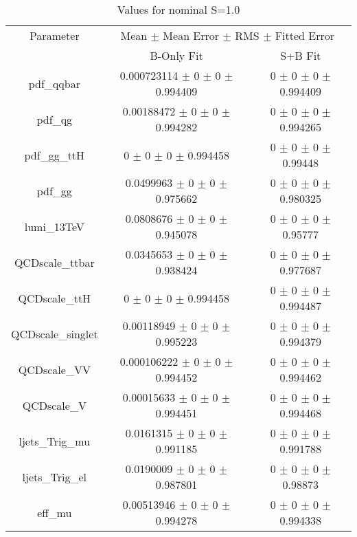 \begin{table}
\centering
\caption{Values for nominal S=1.0}
\begin{tabular}{ccc}
\toprule
Parameter 	& \multicolumn{2}{c}{Mean $\pm$ Mean Error $\pm$ RMS $\pm$ Fitted Error}\\
 	& B-Only Fit & S+B Fit\\
\midrule
pdf\_qqbar 	& \num{0.000723114} $\pm$ \num{0} $\pm$ \num{0} $\pm$ \num{0.994409} 	& \num{0} $\pm$ \num{0} $\pm$ \num{0} $\pm$ \num{0.994409}\\
pdf\_qg 	& \num{0.00188472} $\pm$ \num{0} $\pm$ \num{0} $\pm$ \num{0.994282} 	& \num{0} $\pm$ \num{0} $\pm$ \num{0} $\pm$ \num{0.994265}\\
pdf\_gg\_ttH 	& \num{0} $\pm$ \num{0} $\pm$ \num{0} $\pm$ \num{0.994458} 	& \num{0} $\pm$ \num{0} $\pm$ \num{0} $\pm$ \num{0.99448}\\
pdf\_gg 	& \num{0.0499963} $\pm$ \num{0} $\pm$ \num{0} $\pm$ \num{0.975662} 	& \num{0} $\pm$ \num{0} $\pm$ \num{0} $\pm$ \num{0.980325}\\
lumi\_13TeV 	& \num{0.0808676} $\pm$ \num{0} $\pm$ \num{0} $\pm$ \num{0.945078} 	& \num{0} $\pm$ \num{0} $\pm$ \num{0} $\pm$ \num{0.95777}\\
QCDscale\_ttbar 	& \num{0.0345653} $\pm$ \num{0} $\pm$ \num{0} $\pm$ \num{0.938424} 	& \num{0} $\pm$ \num{0} $\pm$ \num{0} $\pm$ \num{0.977687}\\
QCDscale\_ttH 	& \num{0} $\pm$ \num{0} $\pm$ \num{0} $\pm$ \num{0.994458} 	& \num{0} $\pm$ \num{0} $\pm$ \num{0} $\pm$ \num{0.994487}\\
QCDscale\_singlet 	& \num{0.00118949} $\pm$ \num{0} $\pm$ \num{0} $\pm$ \num{0.995223} 	& \num{0} $\pm$ \num{0} $\pm$ \num{0} $\pm$ \num{0.994379}\\
QCDscale\_VV 	& \num{0.000106222} $\pm$ \num{0} $\pm$ \num{0} $\pm$ \num{0.994452} 	& \num{0} $\pm$ \num{0} $\pm$ \num{0} $\pm$ \num{0.994462}\\
QCDscale\_V 	& \num{0.00015633} $\pm$ \num{0} $\pm$ \num{0} $\pm$ \num{0.994451} 	& \num{0} $\pm$ \num{0} $\pm$ \num{0} $\pm$ \num{0.994468}\\
ljets\_Trig\_mu 	& \num{0.0161315} $\pm$ \num{0} $\pm$ \num{0} $\pm$ \num{0.991185} 	& \num{0} $\pm$ \num{0} $\pm$ \num{0} $\pm$ \num{0.991788}\\
ljets\_Trig\_el 	& \num{0.0190009} $\pm$ \num{0} $\pm$ \num{0} $\pm$ \num{0.987801} 	& \num{0} $\pm$ \num{0} $\pm$ \num{0} $\pm$ \num{0.98873}\\
eff\_mu 	& \num{0.00513946} $\pm$ \num{0} $\pm$ \num{0} $\pm$ \num{0.994278} 	& \num{0} $\pm$ \num{0} $\pm$ \num{0} $\pm$ \num{0.994338}\\

\end{tabular}
\end{table}
